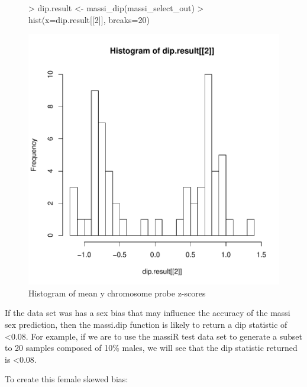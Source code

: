 \documentclass{article}
\begin{document}
\begin{figure}
\begin{center}
\begin{Schunk}
\begin{Sinput}
> dip.result <- massi_dip(massi_select_out)
> hist(x=dip.result[[2]], breaks=20)
\end{Sinput}
\end{Schunk}
\includegraphics{massiR_Vignette-fig6}
\end{center}
\caption{Histogram of mean y chromosome probe z-scores}
\label{fig:fig6}
\end{figure}
\clearpage
If the data set was has a sex bias that may influence the accuracy of the massi sex prediction, then the massi.dip function is likely to return a dip statistic of <0.08. For example, if we are to use the massiR test data set to generate a subset to 20 samples composed of 10\% males, we will see that the dip statistic returned is <0.08.

To create this female skewed bias:
\end{document}
